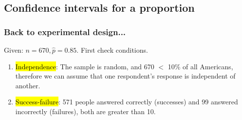 %
%
%
%
%

\subsection{Confidence intervals for a proportion}


\begin{frame}
\frametitle{Back to experimental design...}


\pause
Given: $n = 670, \hat{p} = 0.85$. First check conditions.

\pause
\begin{enumerate}[1.]
\item \hl{Independence}: The sample is random, and 670 $<$ 10\% of all Americans, therefore we can assume that one respondent's response is independent of another.
\pause
\item \hl{Success-failure}: 571 people answered correctly (successes) and 99 answered incorrectly (failures), both are greater than 10.
\end{enumerate}

\end{frame}

